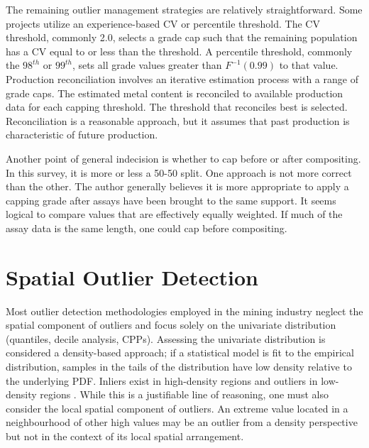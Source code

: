 
The remaining outlier management strategies are relatively straightforward. Some projects utilize an experience-based \gls{CV} or percentile threshold. The \gls{CV} threshold, commonly 2.0, selects a grade cap such that the remaining population has a \gls{CV} equal to or less than the threshold. A percentile threshold, commonly the $98^{th}$ or $99^{th}$, sets all grade values greater than $F^{-1}(0.99)$ to that value. Production reconciliation involves an iterative estimation process with a range of grade caps. The estimated metal content is reconciled to available production data for each capping threshold. The threshold that reconciles best is selected. Reconciliation is a reasonable approach, but it assumes that past production is characteristic of future production.

Another point of general indecision is whether to cap before or after compositing. In this survey, it is more or less a 50-50 split. One approach is not more correct than the other. The author generally believes it is more appropriate to apply a capping grade after assays have been brought to the same support. It seems logical to compare values that are effectively equally weighted. If much of the assay data is the same length, one could cap before compositing.

\FloatBarrier
\section{Spatial Outlier Detection}
\label{sec:02spatial}

Most outlier detection methodologies employed in the mining industry neglect the spatial component of outliers and focus solely on the univariate distribution (quantiles, decile analysis, \glspl{CPP}). Assessing the univariate distribution is considered a density-based approach; if a statistical model is fit to the empirical distribution, samples in the tails of the distribution have low density relative to the underlying \gls{PDF}. Inliers exist in high-density regions and outliers in low-density regions \citep{geron2019hands}. While this is a justifiable line of reasoning, one must also consider the local spatial component of outliers. An extreme value located in a neighbourhood of other high values may be an outlier from a density perspective but not in the context of its local spatial arrangement.


